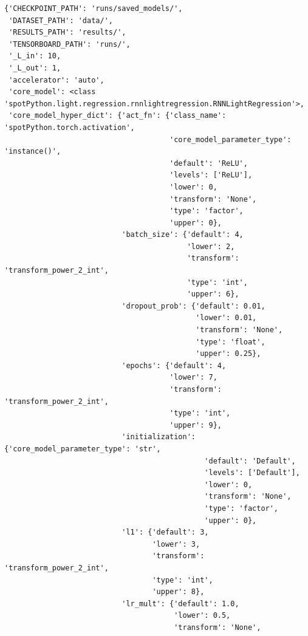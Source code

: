 \documentclass[
  letterpaper,
  DIV=11,
  numbers=noendperiod]{scrreprt}
\begin{document}
\begin{verbatim}
{'CHECKPOINT_PATH': 'runs/saved_models/',
 'DATASET_PATH': 'data/',
 'RESULTS_PATH': 'results/',
 'TENSORBOARD_PATH': 'runs/',
 '_L_in': 10,
 '_L_out': 1,
 'accelerator': 'auto',
 'core_model': <class 'spotPython.light.regression.rnnlightregression.RNNLightRegression'>,
 'core_model_hyper_dict': {'act_fn': {'class_name': 'spotPython.torch.activation',
                                      'core_model_parameter_type': 'instance()',
                                      'default': 'ReLU',
                                      'levels': ['ReLU'],
                                      'lower': 0,
                                      'transform': 'None',
                                      'type': 'factor',
                                      'upper': 0},
                           'batch_size': {'default': 4,
                                          'lower': 2,
                                          'transform': 'transform_power_2_int',
                                          'type': 'int',
                                          'upper': 6},
                           'dropout_prob': {'default': 0.01,
                                            'lower': 0.01,
                                            'transform': 'None',
                                            'type': 'float',
                                            'upper': 0.25},
                           'epochs': {'default': 4,
                                      'lower': 7,
                                      'transform': 'transform_power_2_int',
                                      'type': 'int',
                                      'upper': 9},
                           'initialization': {'core_model_parameter_type': 'str',
                                              'default': 'Default',
                                              'levels': ['Default'],
                                              'lower': 0,
                                              'transform': 'None',
                                              'type': 'factor',
                                              'upper': 0},
                           'l1': {'default': 3,
                                  'lower': 3,
                                  'transform': 'transform_power_2_int',
                                  'type': 'int',
                                  'upper': 8},
                           'lr_mult': {'default': 1.0,
                                       'lower': 0.5,
                                       'transform': 'None',

\end{verbatim}
\end{document}
